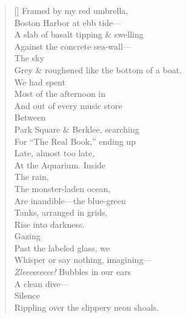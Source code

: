 \label{ch:harbor}
\begin{verse}[\versewidth]
Framed by my red umbrella,\\
Boston Harbor at ebb tide---\\
A slab of basalt tipping \& swelling\\
Against the concrete sea-wall---\\
\hspace*{4\vgap} The sky\\
Grey \& roughened like the bottom of a boat.\\
We had spent\\
Most of the afternoon in\\
And out of every music store\\
\hspace*{4\vgap} Between\\
Park Square \& Berklee, searching\\
For ``The Real Book,'' ending up\\
Late, almost too late,\\
At the Aquarium.     Inside\\
\hspace*{4\vgap} The rain,\\
The monster-laden ocean,\\
Are inaudible---the blue-green\\
Tanks, arranged in grids,\\
Rise into darkness.\\
\hspace*{4\vgap} Gazing\\
Past the labeled glass, we\\
Whisper or say nothing, imagining---\\
\textit{Zleeeeeeeee!} Bubbles in our ears\\
A clean dive---\\
\hspace*{3\vgap} Silence\\
Rippling over the slippery neon shoals.
\end{verse}
